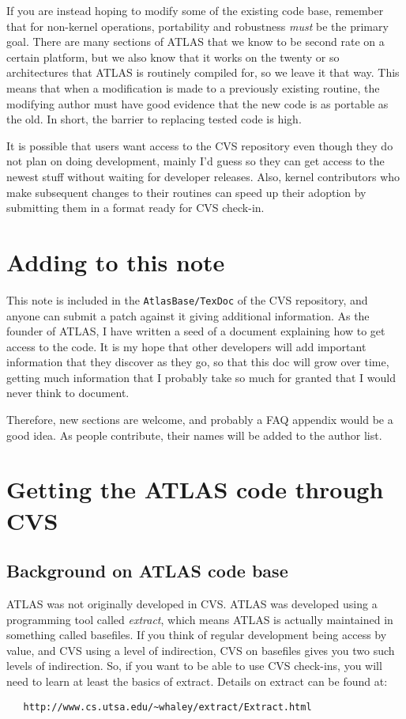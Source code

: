 \documentclass[11pt]{article}
\begin{document}
If you are instead hoping to modify some of the existing code base, remember
that for non-kernel operations, portability and robustness {\em must} be
the primary goal.  There are many sections of ATLAS that we know to be
second rate on a certain platform, but we also know that it works on the
twenty or so architectures that ATLAS is routinely compiled for, so we leave
it that way.  This means that when a modification is made to a previously
existing routine, the modifying author must have good evidence that
the new code is as portable as the old.  In short, the barrier to replacing
tested code is high.

It is possible that users want access to the CVS repository even though they
do not plan on doing development, mainly I'd guess so they can get access
to the newest stuff without waiting for developer releases.  Also,
kernel contributors who make subsequent changes to their routines can speed up
their adoption by submitting them in a format ready for CVS check-in.

\section{Adding to this note}
This note is included in the {\tt AtlasBase/TexDoc} of the CVS repository,
and anyone can submit a patch against it giving additional information.
As the founder of ATLAS, I have written a seed of a document explaining
how to get access to the code.  It is my hope that other developers will
add important information that they discover as they go, so that this doc
will grow over time, getting much information that I probably take so much
for granted that I would never think to document.

Therefore, new sections are welcome, and probably a FAQ appendix would
be a good idea.  As people contribute, their names will be added to the
author list.

\section{Getting the ATLAS code through CVS}

\subsection{Background on ATLAS code base}

ATLAS was not originally developed in CVS.  ATLAS was developed using a
programming tool called {\em extract}, which means ATLAS is actually
maintained in something called basefiles.  If you think
of regular development being access by value, and CVS using a level of
indirection, CVS on basefiles gives you two such levels of indirection.  So,
if you want to be able to use CVS check-ins, you will need to learn at least
the basics of extract.  Details on extract can be found at:
\begin{verbatim}
   http://www.cs.utsa.edu/~whaley/extract/Extract.html
\end{verbatim}
\end{document}
